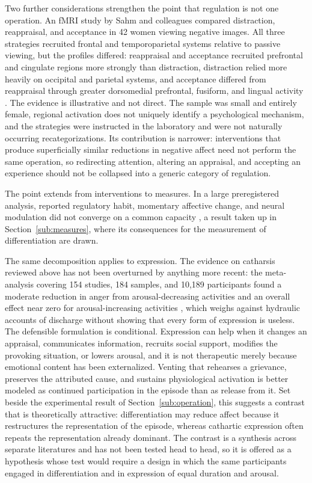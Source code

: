 \documentclass[11pt]{article}
\begin{document}
Two further considerations strengthen the point that regulation is not one operation. An fMRI study by Sahm and colleagues compared distraction, reappraisal, and acceptance in 42 women viewing negative images. All three strategies recruited frontal and temporoparietal systems relative to passive viewing, but the profiles differed: reappraisal and acceptance recruited prefrontal and cingulate regions more strongly than distraction, distraction relied more heavily on occipital and parietal systems, and acceptance differed from reappraisal through greater dorsomedial prefrontal, fusiform, and lingual activity \citep{Sahm2026}. The evidence is illustrative and not direct. The sample was small and entirely female, regional activation does not uniquely identify a psychological mechanism, and the strategies were instructed in the laboratory and were not naturally occurring recategorizations. Its contribution is narrower: interventions that produce superficially similar reductions in negative affect need not perform the same operation, so redirecting attention, altering an appraisal, and accepting an experience should not be collapsed into a generic category of regulation.

The point extends from interventions to measures. In a large preregistered analysis, reported regulatory habit, momentary affective change, and neural modulation did not converge on a common capacity \citep{Sicorello2026}, a result taken up in Section~\ref{sub:measures}, where its consequences for the measurement of differentiation are drawn.

The same decomposition applies to expression. The evidence on catharsis reviewed above has not been overturned by anything more recent: the meta-analysis covering 154 studies, 184 samples, and 10,189 participants found a moderate reduction in anger from arousal-decreasing activities and an overall effect near zero for arousal-increasing activities \citep{Kjaervik2024}, which weighs against hydraulic accounts of discharge without showing that every form of expression is useless. The defensible formulation is conditional. Expression can help when it changes an appraisal, communicates information, recruits social support, modifies the provoking situation, or lowers arousal, and it is not therapeutic merely because emotional content has been externalized. Venting that rehearses a grievance, preserves the attributed cause, and sustains physiological activation is better modeled as continued participation in the episode than as release from it. Set beside the experimental result of Section~\ref{sub:operation}, this suggests a contrast that is theoretically attractive: differentiation may reduce affect because it restructures the representation of the episode, whereas cathartic expression often repeats the representation already dominant. The contrast is a synthesis across separate literatures and has not been tested head to head, so it is offered as a hypothesis whose test would require a design in which the same participants engaged in differentiation and in expression of equal duration and arousal.
\end{document}
